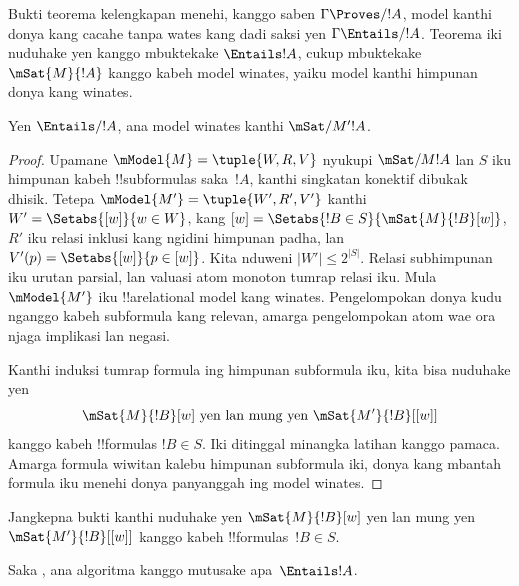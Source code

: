 \documentclass[../../../include/open-logic-section]{subfiles}
\begin{document}

Bukti teorema kelengkapan menehi, kanggo saben $\Gamma \Proves/ !A$,
model kanthi donya kang cacahe tanpa wates kang dadi saksi yen
$\Gamma \Entails/ !A$. Teorema iki nuduhake yen kanggo mbuktekake
$\Entails !A$, cukup mbuktekake $\mSat{M}{!A}$ kanggo kabeh model
winates, yaiku model kanthi himpunan donya kang winates.

\begin{thm}
  Yen $\Entails/ !A$, ana model winates kanthi $\mSat/{M'}{!A}$.
\end{thm}

\begin{proof}
  Upamane $\mModel{M}=\tuple{W, R, V}$ nyukupi $\mSat/{M}{!A}$ lan $S$
  iku himpunan kabeh !!{subformula}s saka~$!A$, kanthi singkatan
  konektif dibukak dhisik. Tetepa
  $\mModel{M'}=\tuple{W', R', V'}$ kanthi $W' = \Setabs{[w]}{w \in W}$,
  kang $[w] = \Setabs{!B \in S}{\mSat{M}{!B}[w]}$, $R'$ iku relasi
  inklusi kang ngidini himpunan padha, lan $V'(p)=\Setabs{[w]}{p \in [w]}$.
  Kita nduweni $|W'| \le 2^{|S|}$. Relasi subhimpunan iku urutan parsial,
  lan valuasi atom monoton tumrap relasi iku. Mula $\mModel{M'}$ iku
  !!a{relational model} kang winates.
Pengelompokan donya kudu nganggo kabeh subformula kang relevan, amarga pengelompokan atom wae ora njaga implikasi lan negasi.

  Kanthi induksi tumrap formula ing himpunan subformula iku,
  kita bisa nuduhake yen
  \[
    \mSat{M}{!B}[w] \text{ yen lan mung yen } \mSat{M'}{!B}[{[w]}]
  \]
  kanggo kabeh !!{formula}s $!B \in S$.
  Iki ditinggal minangka latihan kanggo pamaca.
  Amarga formula wiwitan kalebu himpunan subformula iki, donya kang
  mbantah formula iku menehi donya panyanggah ing model winates.
\end{proof}

\begin{prob}
Jangkepna bukti  kanthi nuduhake
yen $\mSat{M}{!B}[w]$ yen lan mung yen $\mSat{M'}{!B}[{[w]}]$
kanggo kabeh !!{formula}s~$!B \in S$.
\end{prob}

Saka , ana algoritma kanggo mutusake
apa~$\Entails !A$.
\end{document}
